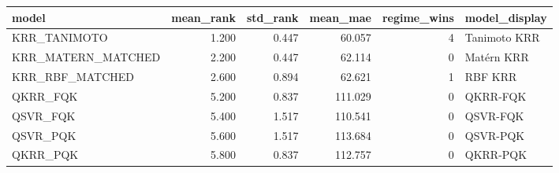 \begin{tabular}{lrrrrl}
\toprule
model & mean\_rank & std\_rank & mean\_mae & regime\_wins & model\_display \\
\midrule
KRR\_TANIMOTO & 1.200 & 0.447 & 60.057 & 4 & Tanimoto KRR \\
KRR\_MATERN\_MATCHED & 2.200 & 0.447 & 62.114 & 0 & Matérn KRR \\
KRR\_RBF\_MATCHED & 2.600 & 0.894 & 62.621 & 1 & RBF KRR \\
QKRR\_FQK & 5.200 & 0.837 & 111.029 & 0 & QKRR-FQK \\
QSVR\_FQK & 5.400 & 1.517 & 110.541 & 0 & QSVR-FQK \\
QSVR\_PQK & 5.600 & 1.517 & 113.684 & 0 & QSVR-PQK \\
QKRR\_PQK & 5.800 & 0.837 & 112.757 & 0 & QKRR-PQK \\
\bottomrule
\end{tabular}
